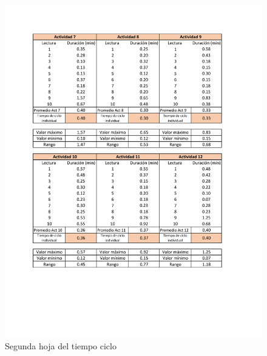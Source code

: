     \begin{figure}[H]
        \centering
        \includegraphics[trim = {1mm 1mm 1mm 1mm},clip,scale=0.45]{34/img/tiempoCicloEnsamble10Lecturas2.pdf}
        \caption{Segunda hoja del tiempo ciclo}
        \label{fig:tiempoCicloEnsamble10Lecturas2}
    \end{figure}
